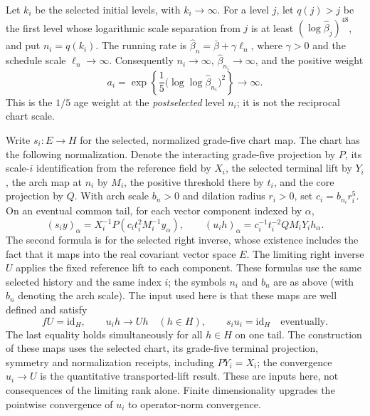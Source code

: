 Let $k_i$ be the selected initial levels, with $k_i\to\infty$. For a level
$j$, let $q(j)>j$ be the first level whose logarithmic scale separation from
$j$ is at least $(\log\widehat\beta_j)^{48}$, and put $n_i=q(k_i)$.
The running rate is $\widehat\beta_n=\bar\beta+\gamma\ell_n$, where $\gamma>0$
and the schedule scale $\ell_n\to\infty$. Consequently $n_i\to\infty$,
$\widehat\beta_{n_i}\to\infty$, and the positive weight
\begin{equation}
 a_i=\exp\!\left\{\frac15\bigl(\log\log\widehat\beta_{n_i}\bigr)^2\right\}
 \longrightarrow\infty.
 \label{eq:trace-sensor-weight}
\end{equation}
This is the $1/5$ age weight at the \emph{postselected} level $n_i$;
it is not the reciprocal chart scale.

Write $s_i:E\to H$ for the selected, normalized grade-five chart map. The
chart has the following normalization. Denote the interacting grade-five
projection by $P$, its scale-$i$ identification from the reference field by
$X_i$, the selected terminal lift by $Y_i$, the arch map at $n_i$ by $M_i$,
the positive threshold there by $t_i$, and the core projection by $Q$.
With arch scale $b_n>0$ and dilation radius $r_i>0$, set
$c_i=b_{n_i}r_i^5$. On an eventual common tail, for each vector component
indexed by $\alpha$,
\begin{equation}
 (s_i y)_\alpha=X_i^{-1}P(c_i t_i^2 M_i^{-1}y_\alpha),\qquad
 (u_i h)_\alpha=c_i^{-1}t_i^{-2}Q M_iY_i h_\alpha.
 \label{eq:trace-sensor-selected-formulas}
\end{equation}
The second formula is for the selected right inverse, whose existence includes
the fact that it maps into the real covariant vector space $E$. The limiting
right inverse $U$ applies the fixed reference lift to each component. These
formulas use the same selected history and the same index $i$; the symbols
$n_i$ and $b_n$ are as above (with $b_n$ denoting the arch scale). The input used here is that these maps
are well defined and satisfy
\begin{equation}
 fU=\mathrm{id}_H,\qquad u_i h\longrightarrow Uh\quad(h\in H),
 \qquad s_i u_i=\mathrm{id}_H\quad\text{eventually}.
 \label{eq:trace-sensor-chart}
\end{equation}
The last equality holds simultaneously for all $h\in H$ on one tail. The
construction of these maps uses the selected chart, its grade-five terminal
projection, symmetry and normalization receipts, including $P Y_i=X_i$;
the convergence $u_i\to U$ is the quantitative transported-lift result.
These are inputs here, not consequences of the limiting rank alone. Finite dimensionality upgrades the
pointwise convergence of $u_i$ to operator-norm convergence.

